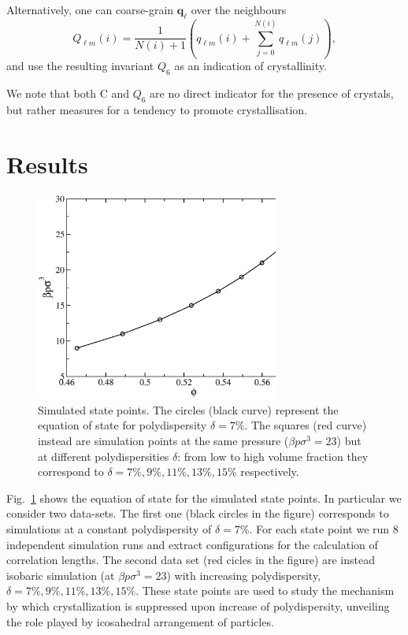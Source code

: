 \documentclass[twocolumn,superscriptaddress]{revtex4-1}
\begin{document}
Alternatively, one can coarse-grain $\mathbf{q}_\ell$ over the neighbours~\cite{lechner}
\begin{equation}
	Q_{\ell m}(i) = \frac{1}{N(i)+1}\left( q_{\ell m}(i) +  \sum_{j=0}^{N(i)} q_{\ell m}(j)\right), 
	\label{eq:Qlm}
\end{equation}
and use the resulting invariant $Q_6$ as an indication of crystallinity.

We note that both $\text{C}$ and $Q_6$ are no direct indicator for the presence of crystals, but rather measures for a tendency to promote crystallisation.

\section{Results}

\begin{figure}
 \centering
 \includegraphics[width=8cm]{./figures/eos.eps}
 \caption{Simulated state points. The circles (black curve) represent the equation of state
for polydispersity $\delta=7\%$. The squares (red curve) instead are simulation points at the same
pressure ($\beta p\sigma^3=23$) but at different polydispersities $\delta$: from low to high
volume fraction they correspond to $\delta=7\%,9\%,11\%,13\%,15\%$ respectively.}
 \label{fig:eos}
\end{figure}


Fig.~\ref{fig:eos} shows the equation of state for the simulated state points. In particular
we consider two data-sets. The first one (black circles in the figure) corresponds to
simulations at a constant polydispersity of $\delta=7\%$. For each state point we run $8$ independent
simulation runs and extract configurations for the calculation of correlation lengths.
The second data set (red cicles in the figure) are instead isobaric simulation (at $\beta p\sigma^3=23$)
with increasing polydispersity, $\delta=7\%,9\%,11\%,13\%,15\%$. These state points are used to study
the mechanism by which crystallization is suppressed upon increase of polydispersity, unveiling the
role played by icosahedral arrangement of particles.
\end{document}
